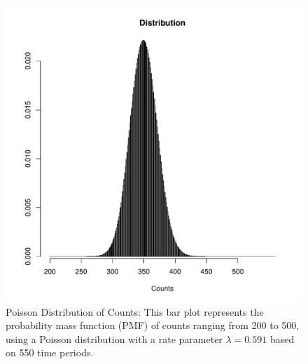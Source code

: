 \begin{figure}
\begin{knitrout}
\color{fgcolor}

{\centering \includegraphics[width=\textwidth-3cm]{figure/ch02_figunnamed-chunk-4-1} 

}


\end{knitrout}
  \caption{Poisson Distribution of Counts: This bar plot represents the probability mass function (PMF) of counts ranging from 200 to 500, using a Poisson distribution with a rate parameter $\lambda = 0.591$ based on 550 time periods.}
  \label{fig:2_3}
\end{figure}

